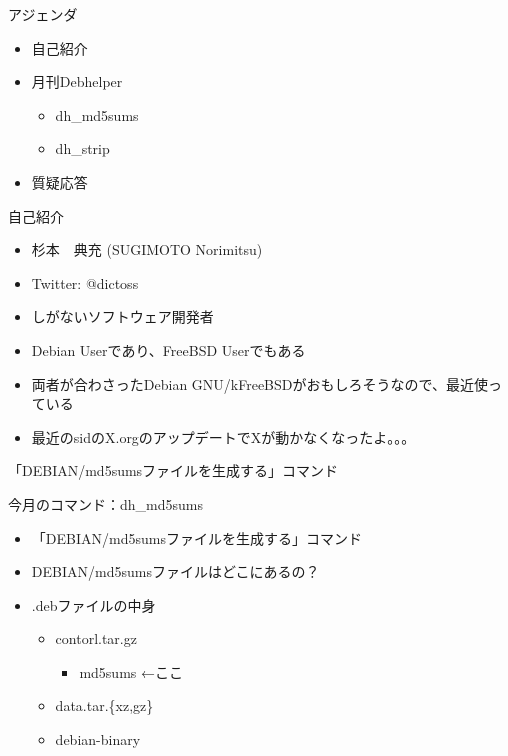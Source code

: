 \frame{\titlepage{}}


\begin{frame}{アジェンダ}
 \begin{itemize}
  \item 自己紹介
  \item 月刊Debhelper
  \begin{itemize}
   \item dh\_md5sums
   \item dh\_strip 
  \end{itemize}
  \item 質疑応答
 \end{itemize}
\end{frame}

\begin{frame}{自己紹介}
 \begin{itemize}
  \item 杉本　典充 (SUGIMOTO Norimitsu)
  \item Twitter: @dictoss
  \item しがないソフトウェア開発者
  \item Debian Userであり、FreeBSD Userでもある
  \item 両者が合わさったDebian GNU/kFreeBSDがおもしろそうなので、最近使っている
  \item 最近のsidのX.orgのアップデートでXが動かなくなったよ。。。
 \end{itemize}
\end{frame}


\begin{frame}
\begin{center}
\LARGE{「DEBIAN/md5sumsファイルを生成する」コマンド}
\end{center}
\end{frame}


\begin{frame}{今月のコマンド：dh\_md5sums}
 \begin{itemize}
  \item 「DEBIAN/md5sumsファイルを生成する」コマンド
  \item DEBIAN/md5sumsファイルはどこにあるの？ 
  \item .debファイルの中身
  \begin{itemize}
   \item contorl.tar.gz
   \begin{itemize}
    \item md5sums  ←ここ
   \end{itemize}
   \item data.tar.\{xz,gz\}
   \item debian-binary
  \end{itemize}
\end{itemize}
\end{frame}

